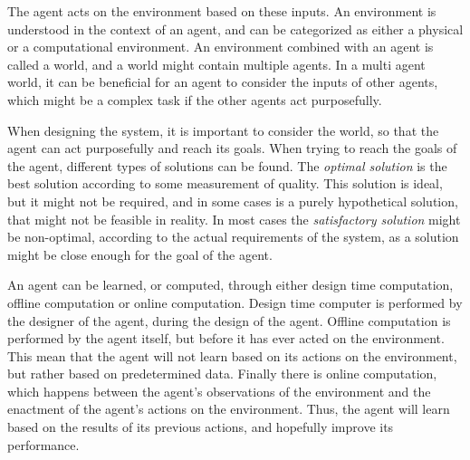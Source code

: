 The agent acts on the environment based on these inputs.
An environment is understood in the context of an agent, and can be categorized as either a physical or a computational environment.
An environment combined with an agent is called a world, and a world might contain multiple agents.
In a multi agent world, it can be beneficial for an agent to consider the inputs of other agents, which might be a complex task if the other agents act purposefully.

When designing the system, it is important to consider the world, so that the agent can act purposefully and reach its goals.
When trying to reach the goals of the agent, different types of solutions can be found.
The \textit{optimal solution} is the best solution according to some measurement of quality.
This solution is ideal, but it might not be required, and in some cases is a purely hypothetical solution, that might not be feasible in reality.
In most cases the \textit{satisfactory solution} might be non-optimal, according to the actual requirements of the system, as a solution might be close enough for the goal of the agent.

An agent can be learned, or computed, through either design time computation, offline computation or online computation.
Design time computer is performed by the designer of the agent, during the design of the agent.
Offline computation is performed by the agent itself, but before it has ever acted on the environment.
This mean that the agent will not learn based on its actions on the environment, but rather based on predetermined data.
Finally there is online computation, which happens between the agent's observations of the environment and the enactment of the agent's actions on the environment.
Thus, the agent will learn based on the results of its previous actions, and hopefully improve its performance.
